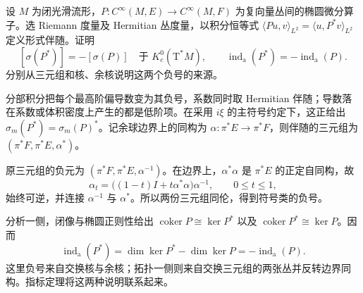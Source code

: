 \begin{exercise}\label{g2:ex:adjoint-symbol-inverse}
	设 \(M\) 为闭光滑流形，\(P:C^\infty(M,E)\to C^\infty(M,F)\) 为复向量丛间的椭圆微分算子。选 Riemann 度量及 Hermitian 丛度量，以积分恒等式 \(\langle Pu,v\rangle_{L^2}=\langle u,P^*v\rangle_{L^2}\) 定义形式伴随。证明
	\[
		[\sigma(P^*)]=-[\sigma(P)]\quad\text{于 }K_c^0(\mathrm T^*M),
		\qquad\operatorname{ind}_{\mathrm a}(P^*)=-\operatorname{ind}_{\mathrm a}(P).
	\]
	分别从三元组和核、余核说明这两个负号的来源。
\end{exercise}
\begin{solution}
	分部积分把每个最高阶偏导数变为其负号，系数同时取 Hermitian 伴随；导数落在系数或体积密度上产生的都是低阶项。在采用 \(i\xi\) 的主符号约定下，这正给出 \(\sigma_m(P^*)=\sigma_m(P)^*\)。记余球边界上的同构为 \(\alpha:\pi^*E\to\pi^*F\)，则伴随的三元组为 \((\pi^*F,\pi^*E,\alpha^*)\)。

	原三元组的负元为 \((\pi^*F,\pi^*E,\alpha^{-1})\)。在边界上，\(\alpha^*\alpha\) 是 \(\pi^*E\) 的正定自同构，故
	\[
		\alpha_t=\bigl((1-t)I+t\alpha^*\alpha\bigr)\alpha^{-1},\qquad0\le t\le1,
	\]
	始终可逆，并连接 \(\alpha^{-1}\) 与 \(\alpha^*\)。所以两份三元组同伦，得到符号类的负号。

	分析一侧，闭像与椭圆正则性给出 \(\operatorname{coker}P\cong\ker P^*\) 以及 \(\operatorname{coker}P^*\cong\ker P\)。因而
	\[
		\operatorname{ind}_{\mathrm a}(P^*)
		=\dim\ker P^*-\dim\ker P
		=-\operatorname{ind}_{\mathrm a}(P).
	\]
	这里负号来自交换核与余核；拓扑一侧则来自交换三元组的两张丛并反转边界同构。指标定理将这两种说明联系起来。
\end{solution}
